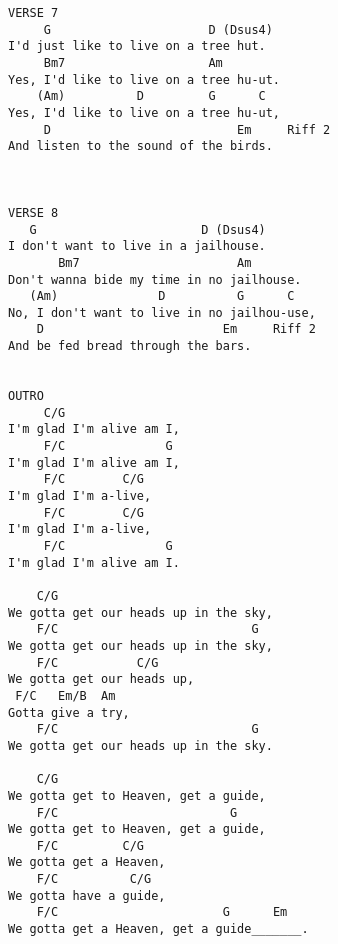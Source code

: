 \documentclass[leqno]{memoir}
\begin{document}
\begin{verbatim}
VERSE 7
     G                      D (Dsus4)
I'd just like to live on a tree hut. 
     Bm7                    Am
Yes, I'd like to live on a tree hu-ut.
    (Am)          D         G      C
Yes, I'd like to live on a tree hu-ut,
     D                          Em     Riff 2
And listen to the sound of the birds.



VERSE 8
   G                       D (Dsus4)
I don't want to live in a jailhouse. 
       Bm7                      Am
Don't wanna bide my time in no jailhouse. 
   (Am)              D          G      C
No, I don't want to live in no jailhou-use,
    D                         Em     Riff 2
And be fed bread through the bars.


OUTRO
     C/G
I'm glad I'm alive am I,
     F/C              G
I'm glad I'm alive am I, 
     F/C        C/G
I'm glad I'm a-live,
     F/C        C/G
I'm glad I'm a-live,
     F/C              G
I'm glad I'm alive am I.

    C/G
We gotta get our heads up in the sky,
    F/C                           G
We gotta get our heads up in the sky,
    F/C           C/G
We gotta get our heads up,
 F/C   Em/B  Am
Gotta give a try,
    F/C                           G
We gotta get our heads up in the sky.

    C/G
We gotta get to Heaven, get a guide, 
    F/C                        G
We gotta get to Heaven, get a guide,
    F/C         C/G
We gotta get a Heaven,
    F/C          C/G
We gotta have a guide, 
    F/C                       G      Em
We gotta get a Heaven, get a guide_______.
\end{verbatim}
\newpage
\end{document}

